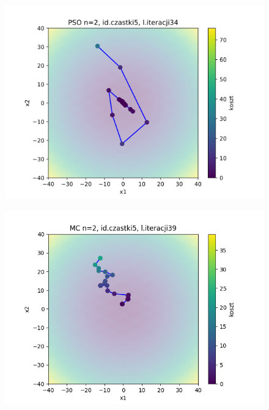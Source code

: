 \documentclass[11pt, a4paper, oneside]{article}
\begin{document}

\begin{figure}[H]
\centering
\begin{minipage}[b]{\dimexpr.5\textwidth-1em}
  \centering
  \includegraphics[width=1\linewidth]{grafiki/Wykresy2d/zad1_pso_plot_5.png}
  \label{fig:trajektoriaWybrana:PSO1}
\end{minipage} \hfill
\begin{minipage}[b]{\dimexpr.5\textwidth-1em}
  \centering
  \includegraphics[width=1\linewidth]{grafiki/Wykresy2d/Zad1_MC_plot_5.png}
  \label{fig:trajektoriaWybrana:MC1}
\end{minipage}
\end{figure}
\end{document}
